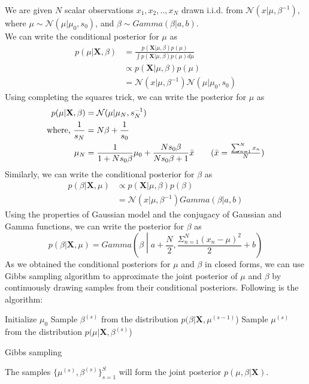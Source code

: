\documentclass[a4paper,11pt]{article}
\begin{document}
\begin{pmisolution} 
\noindent We are given $N$ scalar observations $x_1, x_2, .., x_N$ drawn i.i.d. from $\mathcal{N}(x|\mu, \beta^{-1})$, where $\mu \sim \mathcal{N}(\mu| \mu_0, s_0)$, and $\beta \sim Gamma(\beta| a,b)$.
\\We can write the conditional posterior for $\mu$ as
\begin{align}
    p(\mu|\textbf{X}, \beta) &= \frac{p(\textbf{X}|\mu, \beta)p(\mu)}{\int p(\textbf{X}|\mu, \beta)p(\mu)d\mu}
    \nonumber
    \\ &\propto p(\textbf{X}|\mu, \beta)p(\mu)
    \nonumber
    \\ &= \mathcal{N}(x|\mu, \beta^{-1}) \mathcal{N}(\mu| \mu_0, s_0)
    \nonumber
\end{align}
Using completing the squares trick, we can write the posterior for $\mu$ as
\begin{align}
    p(\mu|\textbf{X}, \beta) &= \mathcal{N}(\mu| \mu_N, s_N^{-1})
    \nonumber
    \\ \text{where, } \frac{1}{s_N} &= N\beta + \frac{1}{s_0}
    \nonumber
    \\ \mu_N &= \frac{1}{1+Ns_0\beta }\mu_0 + \frac{Ns_0\beta}{Ns_0\beta+1}\Bar{x}
    \tag{$\Bar{x} = \frac{\sum_{n=1}^Nx_n}{N}$}
\end{align}
Similarly, we can write the conditional posterior for $\beta$ as
\begin{align}
    p(\beta|\textbf{X}, \mu) &\propto p(\textbf{X}|\mu, \beta)p(\beta)
    \nonumber
    \\ &= \mathcal{N}(x|\mu, \beta^{-1}) Gamma(\beta| a,b)
    \nonumber
\end{align}
Using the properties of Gaussian model and the conjugacy of Gaussian and Gamma functions, we can write the posterior for $\beta$ as
\begin{equation*}
    p(\beta|\textbf{X}, \mu) = Gamma \left(\beta \middle| a + \frac{N}{2}, \frac{\Sigma_{n=1}^{N} (x_n - \mu)^2}{2} + b \right)
\end{equation*}
As we obtained the conditional posteriors for $\mu$ and $\beta$ in closed forms, we can use Gibbs sampling algorithm to approximate the joint posterior of $\mu$ and $\beta$ by continuously drawing samples from their conditional posteriors. Following is the algorithm:\\
\begin{algorithm}[H]
\SetAlgoLined
 Initialize $\mu_0$\;
  {
 Sample $\beta^{(s)}$ from the distribution $p(\beta|\textbf{X}, \mu^{(s-1)}$)\;
 Sample $\mu^{(s)}$ from the distribution $p(\mu|\textbf{X}, \beta^{(s)}$)\;
 }
 \caption{Gibbs sampling}
\end{algorithm}
The samples $\{\mu^{(s)}, \beta^{(s)}\}_{s=1}^S$ will form the joint posterior $p(\mu, \beta|\textbf{X})$.

\end{pmisolution}
\end{document}
